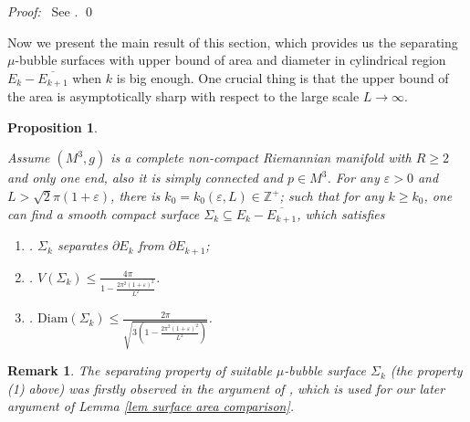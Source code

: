 \documentclass[11pt]{amsart}
\newtheorem{prop}[theorem]{Proposition}
\newtheorem{remark}[theorem]{Remark}
\numberwithin{equation}{section}
\def\pf{{\it Proof:}~}
\begin{document}
\pf
{See \cite[Proposition $3.2$]{CLS-0}. 
}
\qed

Now we present the main result of this section, which provides us the separating $\mu$-bubble surfaces with upper bound of area and diameter in cylindrical region $E_k- \overline{E_{k+ 1}}$ when $k$ is big enough. One crucial thing is that the upper bound of the area is asymptotically sharp with respect to the large scale $L\rightarrow \infty$.
\begin{prop}\label{prop volume of separating bubble surfaces}
{Assume $(M^3, g)$ is a complete non-compact Riemannian manifold with $R\geq 2$ and only one end, also it is simply connected and $p\in M^3$.  For any $\varepsilon>0$ and $L> \sqrt{2}\pi(1+\varepsilon)$, there is $k_0= k_0(\varepsilon, L)\in \mathbb{Z}^+$; such that for any $k\geq k_0$, one can find a smooth compact surface $\Sigma_k\subseteq E_k- \overline{E_{k+ 1}}$, which satisfies
\begin{enumerate}
\item[(1)]. $\Sigma_k$ separates $\partial E_k$ from $\partial E_{k+ 1}$;
\item[(2)]. $\displaystyle V(\Sigma_k)\leq \frac{4\pi}{1- \frac{2\pi^2(1+\varepsilon)^2}{L^2}}$. 
\item[(3)]. $\mathrm{Diam}(\Sigma_k)\leq \frac{2\pi}{\sqrt{3(1- \frac{2\pi^2(1+ \varepsilon)^2}{L^2})}}$.
\end{enumerate}
}
\end{prop}

\begin{remark}\label{rem separate}
{The separating property of suitable $\mu$-bubble surface $\Sigma_k$ (the property (1) above) was firstly observed in the argument of \cite[Lemma $5.4$]{CLS-0}, which is used for our later argument of Lemma \ref{lem surface area comparison}. 
}
\end{remark}
\end{document}
